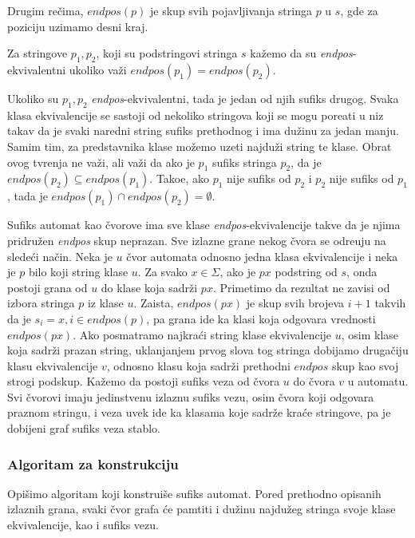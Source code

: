 Drugim re\v cima, $endpos(p)$ je skup svih pojavljivanja stringa $p$ u $s$, gde za poziciju uzimamo desni kraj.

\begin{dfn}
Za stringove $p_1,p_2$, koji su podstringovi stringa $s$ ka\v zemo da su \textit{endpos}-ekvivalentni ukoliko va\v zi $endpos(p_1) = endpos(p_2)$.
\end{dfn}

Ukoliko su $p_1,p_2$ \textit{endpos}-ekvivalentni, tada je jedan od njih sufiks drugog. Svaka klasa ekvivalencije se sastoji od nekoliko stringova koji se mogu pore\dj ati u niz takav da je svaki naredni string sufiks prethodnog i ima du\v zinu za jedan manju. Samim tim, za predstavnika klase mo\v zemo uzeti najdu\v zi string te klase. Obrat ovog tvr\dj enja ne va\v zi, ali va\v zi da ako je $p_1$ sufiks stringa $p_2$, da je $endpos(p_2) \subseteq endpos(p_1)$. Tako\dj e, ako $p_1$ nije sufiks od $p_2$ i $p_2$ nije sufiks od $p_1$, tada je $endpos(p_1) \cap endpos(p_2) = \emptyset$. \cite{suffixautomatonrad}

Sufiks automat kao \v cvorove ima sve klase \textit{endpos}-ekvivalencije takve da je njima pridru\v zen \textit{endpos} skup neprazan. Sve izlazne grane nekog \v cvora se odre\dj uju na slede\' ci na\v cin. Neka je $u$ \v cvor automata odnosno jedna klasa ekvivalencije i neka je $p$ bilo koji string klase $u$. Za svako $x \in \Sigma$, ako je $px$ podstring od $s$, onda postoji grana od $u$ do klase koja sadr\v zi $px$. Primetimo da rezultat ne zavisi od izbora stringa $p$ iz klase $u$. Zaista, $endpos(px)$ je skup svih brojeva $i+1$ takvih da je $s_i = x, i \in endpos(p)$, pa grana ide ka klasi koja odgovara vrednosti $endpos(px)$. Ako posmatramo najkra\' ci string klase ekvivalencije $u$, osim klase koja sadr\v zi prazan string, uklanjanjem prvog slova tog stringa dobijamo druga\v ciju klasu ekvivalencije $v$, odnosno klasu koja sadr\v zi prethodni $endpos$ skup kao svoj strogi podskup. Ka\v zemo da postoji sufiks veza od \v cvora $u$ do \v cvora $v$ u automatu. Svi \v cvorovi imaju jedinstvenu izlaznu sufiks vezu, osim \v cvora koji odgovara praznom stringu, i veza uvek ide ka klasama koje sadr\v ze kra\' ce stringove, pa je dobijeni graf sufiks veza stablo.

\subsubsection{Algoritam za konstrukciju}

Opi\v simo algoritam koji konstrui\v se sufiks automat. Pored prethodno opisanih izlaznih grana, svaki \v cvor grafa \' ce pamtiti i du\v zinu najdu\v zeg stringa svoje klase ekvivalencije, kao i sufiks vezu.

